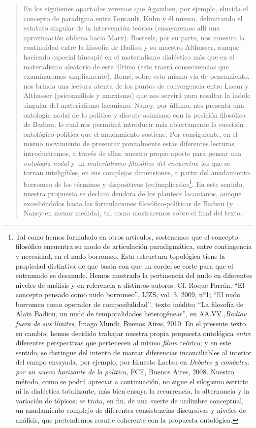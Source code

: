 \begin{quote}
En los siguientes apartados veremos que Agamben, por ejemplo, elucida el concepto de paradigma entre Foucault, Kuhn y él mismo, delimitando el estatuto singular de la intervención teórica (ensayaremos allí una aproximación oblicua hacia Marx). Bosteels, por su parte, nos muestra la continuidad entre la filosofía de Badiou y su maestro Althusser, aunque haciendo especial hincapié en el materialismo dialéctico más que en el materialismo aleatorio de este último (esto traerá consecuencias que examinaremos ampliamente). Romé, sobre esta misma vía de pensamiento, nos brinda una lectura atenta de los puntos de convergencia entre Lacan y Althusser (psicoanálisis y marxismo) que nos servirá para resaltar la índole singular del materialismo lacaniano. Nancy, por último, nos presenta una ontología nodal de lo político y discute asimismo con la posición filosófica de Badiou, lo cual nos permitirá introducir más abiertamente la cuestión ontológico-política que el anudamiento sostiene. Por consiguiente, en el mismo movimiento de presentar parcialmente estas diferentes lecturas introduciremos, a través de ellas, nuestro propio aporte para pensar una \emph{ontología nodal} y un \emph{materialismo filosófico del encuentro}; los que se tornan inteligibles, en sus complejas dimensiones, a partir del anudamiento borromeo de los términos y dispositivos (co)implicados\footnote{Tal como hemos formulado en otros artículos, sostenemos que el concepto filosófico encuentra su modo de articulación paradigmática, entre contingencia y necesidad, en el nudo borromeo. Esta estructura topológica tiene la propiedad distintiva de que basta con que un cordel se corte para que el entramado  se desanude. Hemos mostrado la pertinencia del nudo en diferentes niveles de análisis y en referencia a distintos autores. Cf. Roque Farrán, \enquote{El concepto pensado como nudo borromeo}, IJZS, vol. 3, 2009, nº1; \enquote{El nudo borromeo como operador de composibilidad}, texto inédito; \enquote{La filosofía de Alain Badiou, un nudo de temporalidades heterogéneas}, en AA.VV.,\emph{Badiou fuera de sus límites,} Imago Mundi, Buenos Aires, 2010. En el presente texto, en cambio, hemos decidido trabajar nuestra propia propuesta ontológica \emph{entre} diferentes perspectivas que pertenecen al mismo \emph{filum} teórico; y en este sentido, se distingue del intento de marcar diferencias inconciliables al interior del campo ensayada, por ejemplo, por Ernesto Laclau en \emph{Debates y combates: por un nuevo horizonte de la política,} FCE, Buenos Aires, 2008. Nuestro método, como se podrá apreciar a continuación, no sigue el silogismo estricto ni la dialéctica totalizante, más bien ensaya la recurrencia, la alternancia y la variación de tópicos; se trata, en fin, de una suerte de urdimbre conceptual, un anudamiento complejo de diferentes consistencias discursivas y niveles de análisis, que pretendemos resulte coherente con la propuesta ontológica.}. En este sentido, nuestra propuesta se declara deudora de los planteos lacanianos, aunque excediéndolos hacia las formulaciones filosófico-políticas de Badiou (y Nancy en menor medida), tal como mostraremos sobre el final del texto.


\end{quote}

